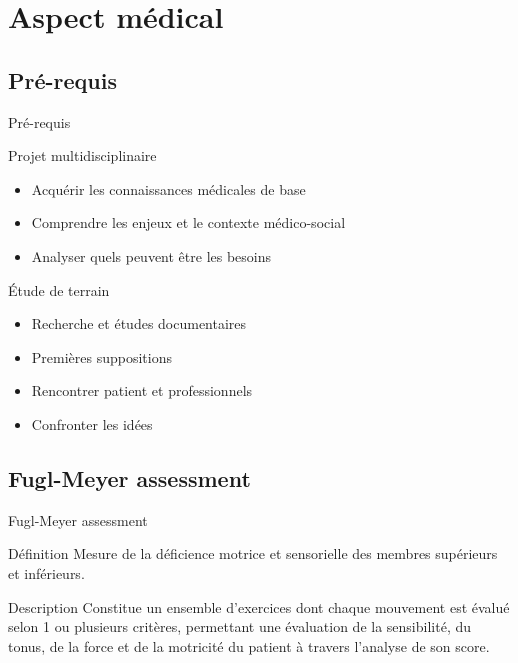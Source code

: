 \section{Aspect médical}

\begin{frame}
\end{frame}


\subsection{Pré-requis}
\begin{frame}{Pré-requis}
	\begin{block}{Projet multidisciplinaire}
		\begin{itemize}
			\item Acquérir les connaissances médicales de base  \pause
			\item Comprendre les enjeux et le contexte médico-social  \pause
			\item Analyser quels peuvent être les besoins
		\end{itemize}			
	\end{block}  \pause
		\begin{block}{Étude de terrain}
		\begin{itemize}
			\item Recherche et études documentaires  \pause
			\item Premières suppositions   \pause
			\item Rencontrer patient et professionnels  \pause
			\item Confronter les idées
		\end{itemize}			
	\end{block}
\end{frame}

\subsection{Fugl-Meyer assessment}
\begin{frame}{Fugl-Meyer assessment}
	\begin{block}{Définition}
Mesure de la déficience motrice et sensorielle des membres supérieurs et inférieurs.
	\end{block}  \pause
	\begin{block}{Description}
Constitue un ensemble d'exercices dont chaque mouvement est évalué selon 1 ou plusieurs critères, permettant une évaluation de la sensibilité, du tonus, de la force et de la motricité du patient à travers l'analyse de son score.
	\end{block}
\end{frame}

